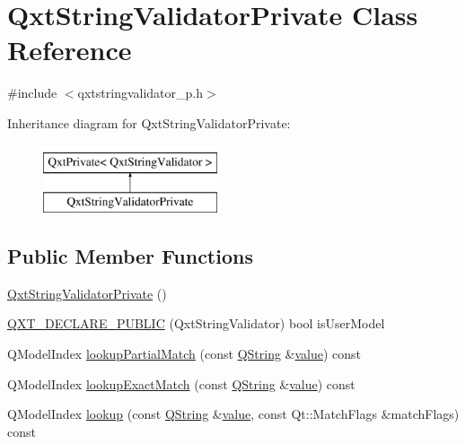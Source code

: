 \hypertarget{class_qxt_string_validator_private}{\section{Qxt\-String\-Validator\-Private Class Reference}
\label{class_qxt_string_validator_private}
}


{\ttfamily \#include $<$qxtstringvalidator\-\_\-p.\-h$>$}

Inheritance diagram for Qxt\-String\-Validator\-Private\-:\begin{figure}[H]
\begin{center}
\leavevmode
\includegraphics[height=2.000000cm]{class_qxt_string_validator_private}
\end{center}
\end{figure}
\subsection*{Public Member Functions}
\begin{DoxyCompactItemize}
\item 
\hyperlink{class_qxt_string_validator_private_a4c96e28725cd434351991154cedf86bc}{Qxt\-String\-Validator\-Private} ()
\item 
\hyperlink{class_qxt_string_validator_private_aed3f0d8a330ef678874ff0d2b1ad1240}{Q\-X\-T\-\_\-\-D\-E\-C\-L\-A\-R\-E\-\_\-\-P\-U\-B\-L\-I\-C} (Qxt\-String\-Validator) bool is\-User\-Model
\item 
Q\-Model\-Index \hyperlink{class_qxt_string_validator_private_a0a5cc949258cb2a1b70321c871e852af}{lookup\-Partial\-Match} (const \hyperlink{group___u_a_v_objects_plugin_gab9d252f49c333c94a72f97ce3105a32d}{Q\-String} \&\hyperlink{glext_8h_aa0e2e9cea7f208d28acda0480144beb0}{value}) const 
\item 
Q\-Model\-Index \hyperlink{class_qxt_string_validator_private_a297ca356fa10936142ca427caa2cb016}{lookup\-Exact\-Match} (const \hyperlink{group___u_a_v_objects_plugin_gab9d252f49c333c94a72f97ce3105a32d}{Q\-String} \&\hyperlink{glext_8h_aa0e2e9cea7f208d28acda0480144beb0}{value}) const 
\item 
Q\-Model\-Index \hyperlink{class_qxt_string_validator_private_adfc6b928f70ddf91626614befdca3551}{lookup} (const \hyperlink{group___u_a_v_objects_plugin_gab9d252f49c333c94a72f97ce3105a32d}{Q\-String} \&\hyperlink{glext_8h_aa0e2e9cea7f208d28acda0480144beb0}{value}, const Qt\-::\-Match\-Flags \&match\-Flags) const 
\end{DoxyCompactItemize}
